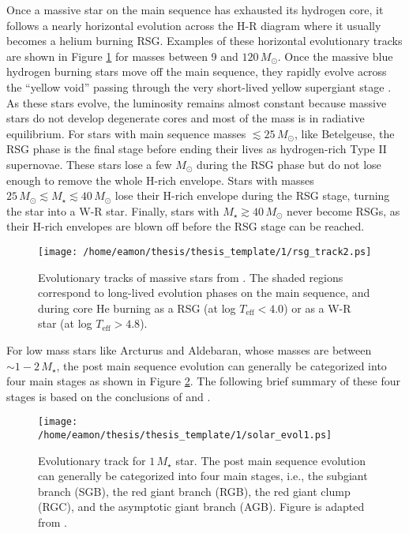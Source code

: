 Once a massive star on the main sequence has exhausted its  hydrogen core, it follows a nearly horizontal evolution across the H-R diagram where it usually becomes a helium burning RSG. Examples of these horizontal evolutionary tracks are shown in Figure \ref{fig:1.5.2.1} for masses between 9 and $120\,M_{\odot}$. Once the massive blue hydrogen burning stars move off the main sequence, they rapidly evolve across the ``yellow void'' passing through the very short-lived yellow supergiant stage \citep{levesque_2010}. As these stars evolve, the luminosity remains almost constant because massive stars do not develop degenerate cores and most of the mass is in radiative equilibrium. For stars with main sequence masses $\lesssim 25\,M_{\odot}$, like Betelgeuse, the RSG phase is the final stage before ending their lives as hydrogen-rich Type II supernovae. These stars lose a few $M_{\odot}$ during the RSG phase but do not lose enough to remove the whole H-rich envelope. Stars with masses $25\,M_{\odot}\lesssim M_{\star} \lesssim 40\,M_{\odot}$ lose their H-rich envelope during the RSG stage, turning the star into a W-R star. Finally, stars with $M_{\star} \gtrsim 40\,M_{\odot}$ never become RSGs, as their H-rich envelopes are blown off before the RSG stage can be reached.

\begin{figure}[hbt!]
\centering 
          \texttt{[image: /home/eamon/thesis/thesis\_template/1/rsg\_track2.ps]}
\caption[Evolutionary tracks of massive stars]{Evolutionary tracks of massive stars from \cite{maeder_1987}. The shaded regions correspond to long-lived evolution phases on the main sequence, and during core He burning as a RSG (at log $T_{\mathrm{eff}} < 4.0$) or as a W-R star (at log $T_{\mathrm{eff}} > 4.8$).}
\label{fig:1.5.2.1}
\end{figure}

For low mass stars like Arcturus and Aldebaran, whose masses are between $\sim 1-2\,M_{\star}$, the post main sequence evolution can generally be categorized into four main stages as shown in Figure \ref{fig:1.5.2.2}. The following brief summary of these four stages is based on the conclusions of \cite{iben_1967} and \cite{ryan_2010}.

\begin{figure}[hbt!]
\centering 
    \texttt{[image: /home/eamon/thesis/thesis\_template/1/solar\_evol1.ps]}
\caption[Evolution track of a low mass star]{Evolutionary track for $1\,M_{\star}$ star. The post main sequence evolution can generally be categorized into four main stages, i.e., the subgiant branch (SGB), the red giant branch (RGB), the red giant clump (RGC), and the asymptotic giant branch (AGB). Figure is adapted from \cite{ryan_2010}.}
\label{fig:1.5.2.2}
\end{figure}

